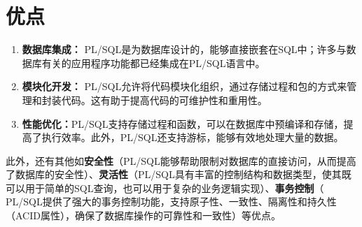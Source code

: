 \documentclass[11pt, a4paper, oneside, UTF8]{ctexbook}
\let\kaishu\relax %
\begin{document}
\section{优点}
\begin{enumerate}
  \item {\bfseries\kaishu 数据库集成：} PL/SQL是为数据库设计的，能够直接嵌套在SQL中；许多与数据库有关的应用程序功能都已经集成在PL/SQL语言中。
  \item {\bfseries\kaishu 模块化开发：} PL/SQL允许将代码模块化组织，通过存储过程和包的方式来管理和封装代码。这有助于提高代码的可维护性和重用性。
  \item {\bfseries\kaishu 性能优化：}PL/SQL支持存储过程和函数，可以在数据库中预编译和存储，提高了执行效率。此外，PL/SQL还支持游标，能够有效地处理大量的数据。
\end{enumerate}
此外，还有其他如\textbf{安全性}（PL/SQL能够帮助限制对数据库的直接访问，从而提高了数据库的安全性）、\textbf{灵活性}（PL/SQL具有丰富的控制结构和数据类型，使其既可以用于简单的SQL查询，也可以用于复杂的业务逻辑实现）、\textbf{事务控制}（ PL/SQL提供了强大的事务控制功能，支持原子性、一致性、隔离性和持久性（ACID属性），确保了数据库操作的可靠性和一致性）等优点。
\end{document}
